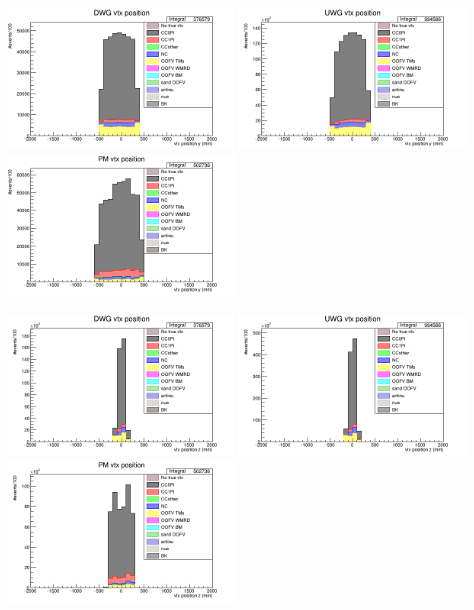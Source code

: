 \documentclass[%
 reprint,
 amsmath,amssymb,
 aps,
]{revtex4-2}
\begin{document}
    \includegraphics[width=0.45\textwidth]{images/vtx_reco_pos[1]_wgbm_topo_DWG_accum_level[][26]_data_mc.png}
    \includegraphics[width=0.45\textwidth]{images/vtx_reco_pos[1]_wgbm_topo_UWG_accum_level[][16]_data_mc.png}
    \includegraphics[width=0.45\textwidth]{images/vtx_reco_pos[1]_wgbm_topo_PM_accum_level[][06]_data_mc.png}
    
    \includegraphics[width=0.45\textwidth]{images/vtx_reco_pos[2]_wgbm_topo_DWG_accum_level[][26]_data_mc.png}
    \includegraphics[width=0.45\textwidth]{images/vtx_reco_pos[2]_wgbm_topo_UWG_accum_level[][16]_data_mc.png}
    \includegraphics[width=0.45\textwidth]{images/vtx_reco_pos[2]_wgbm_topo_PM_accum_level[][06]_data_mc.png}
\end{document}
